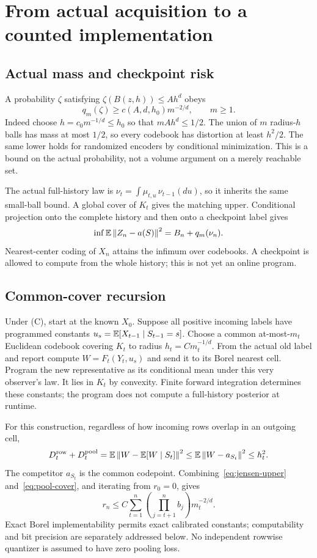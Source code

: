 \section{From actual acquisition to a counted implementation}\label{sec:transfer}
\subsection{Actual mass and checkpoint risk}
A probability $\zeta$ satisfying $\zeta(B(z,h))\le A h^d$ obeys
\begin{equation}\label{eq:mass-quantization}
 q_m(\zeta)\ge c(A,d,h_0)m^{-2/d},\qquad m\ge1.
\end{equation}
Indeed choose $h=c_0m^{-1/d}\le h_0$ so that $mAh^d\le1/2$. The union of $m$ radius-$h$ balls has mass at most $1/2$, so every codebook has distortion at least $h^2/2$. The same lower holds for randomized encoders by conditional minimization. This is a bound on the actual probability, not a volume argument on a merely reachable set.

The actual full-history law is
$\nu_t=\int\mu_{t,u}\,\nu_{t-1}(du)$, so it inherits the same small-ball bound. A global cover of $K_t$ gives the matching upper. Conditional projection onto the complete history and then onto a checkpoint label gives
\[
 \inf\mathbb E\left\lVert Z_n-a(S)\right\rVert^2=B_n+q_m(\nu_n).
\]
Nearest-center coding of $X_n$ attains the infimum over codebooks. A checkpoint is allowed to compute from the whole history; this is not yet an online program.

\subsection{Common-cover recursion}
Under (C), start at the known $X_0$. Suppose all positive incoming labels have programmed constants $u_s=\mathbb E[X_{t-1}\mid S_{t-1}=s]$. Choose a common at-most-$m_t$ Euclidean codebook covering $K_t$ to radius $h_t=Cm_t^{-1/d}$. From the actual old label and report compute $W=F_t(Y_t,u_s)$ and send it to its Borel nearest cell. Program the new representative as its conditional mean under this very observer's law. It lies in $K_t$ by convexity. Finite forward integration determines these constants; the program does not compute a full-history posterior at runtime.

For this construction, regardless of how incoming rows overlap in an outgoing cell,
\begin{equation}\label{eq:pool-cover}
 D^{\rm row}_t+D^{\rm pool}_t
 =\mathbb E\left\lVert W-\mathbb E[W\mid S_t]\right\rVert^2
 \le\mathbb E\left\lVert W-a_{S_t}\right\rVert^2\le h_t^2.
\end{equation}
The competitor $a_{S_t}$ is the common codepoint. Combining~\eqref{eq:jensen-upper} and~\eqref{eq:pool-cover}, and iterating from $r_0=0$, gives
\begin{equation}\label{eq:curvature-recursion}
 r_n\le C\sum_{t=1}^n\left(\prod_{j=t+1}^n b_j\right)m_t^{-2/d}.
\end{equation}
Exact Borel implementability permits exact calibrated constants; computability and bit precision are separately addressed below. No independent rowwise quantizer is assumed to have zero pooling loss.

